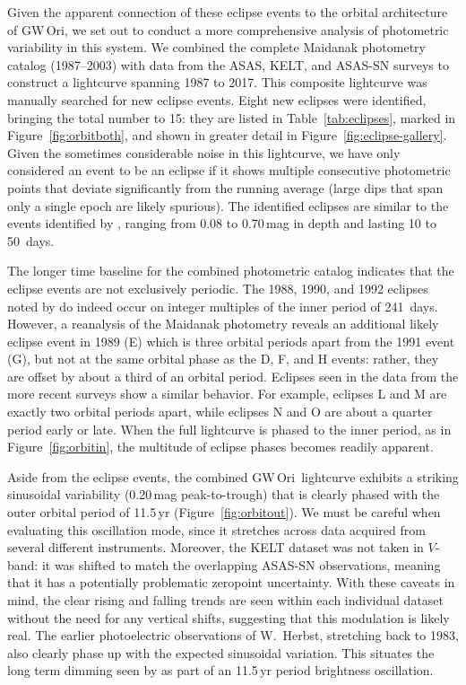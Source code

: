 \documentclass[twocolumn]{aastex61}
\newcommand{\obj}{GW\,Ori}
\begin{document}
Given the apparent connection of these eclipse events to the orbital architecture of \obj, we set out to conduct a more comprehensive analysis of photometric variability in this system. We combined the complete Maidanak photometry catalog (1987--2003) with data from the ASAS, KELT, and ASAS-SN surveys to construct a lightcurve spanning 1987 to 2017. This composite lightcurve was manually searched for new eclipse events.  Eight new eclipses were identified, bringing the total number to 15: they are listed in Table~\ref{tab:eclipses}, marked in Figure~\ref{fig:orbitboth}, and shown in greater detail in Figure~\ref{fig:eclipse-gallery}. Given the sometimes considerable noise in this lightcurve, we have only considered an event to be an eclipse if it shows multiple consecutive photometric points that deviate significantly from the running average (large dips that span only a single epoch are likely spurious). The identified eclipses are similar to the events identified by \citet{shevchenko92,shevchenko98}, ranging from 0.08 to 0.70\,mag in depth and lasting 10 to \mbox{50 days}. 

The longer time baseline for the combined photometric catalog indicates that the eclipse events are not exclusively periodic.  The 1988, 1990, and 1992 eclipses noted by \citet{shevchenko98} do indeed occur on integer multiples of the inner period of \mbox{241 days}. However, a reanalysis of the Maidanak photometry reveals an additional likely eclipse event in 1989 (E) which is three orbital periods apart from the 1991 event (G), but not at the same orbital phase as the D, F, and H events: rather, they are offset by about a third of an orbital period. Eclipses seen in the data from the more recent surveys show a similar behavior. For example, eclipses L and M are exactly two orbital periods apart, while eclipses N and O are about a quarter period early or late. When the full lightcurve is phased to the inner period, as in Figure~\ref{fig:orbitin}, the multitude of eclipse phases becomes readily apparent.

Aside from the eclipse events, the combined \obj\ lightcurve exhibits a striking sinusoidal variability (0.20\,mag peak-to-trough) that is clearly phased with the outer orbital period of 11.5\,yr (Figure~\ref{fig:orbitout}). We must be careful when evaluating this oscillation mode, since it stretches across data acquired from several different instruments. Moreover, the KELT dataset was not taken in $V$-band: it was shifted to match the overlapping ASAS-SN observations, meaning that it has a potentially problematic zeropoint uncertainty. With these caveats in mind, the clear rising and falling trends are seen within each individual dataset without the need for any vertical shifts, suggesting that this modulation is likely real. The earlier photoelectric observations of W.~Herbst, stretching back to 1983, also clearly phase up with the expected sinusoidal variation. This situates the long term dimming seen by \citet{shevchenko98} as part of an 11.5\,yr period brightness oscillation.
\end{document}
